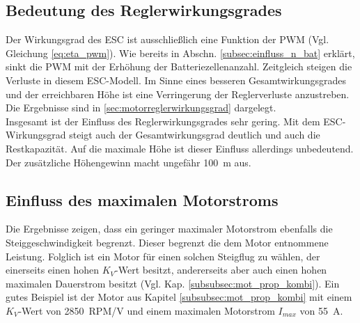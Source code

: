 \subsection{Bedeutung des Reglerwirkungsgrades}
\label{subsec:einfluss_eta_pwm}
Der Wirkungsgrad des ESC ist ausschließlich eine Funktion der PWM (Vgl. Gleichung \ref{eq:eta_pwm}). Wie bereits in Abschn. \ref{subsec:einfluss_n_bat} erklärt, sinkt die PWM mit der Erhöhung der Batteriezellenanzahl. Zeitgleich steigen die Verluste in diesem ESC-Modell. Im Sinne eines besseren Gesamtwirkungsgrades und der erreichbaren Höhe ist eine Verringerung der Reglerverluste anzustreben. Die Ergebnisse sind in \ref{sec:motorreglerwirkungsgrad} dargelegt. \\
Insgesamt ist der Einfluss des Reglerwirkungsgrades sehr gering. Mit dem ESC-Wirkungsgrad steigt auch der Gesamtwirkungsgrad deutlich und auch die Restkapazität. Auf die maximale Höhe ist dieser Einfluss allerdings unbedeutend. Der zusätzliche Höhengewinn macht ungefähr \SI{100}{m} aus.



\subsection{Einfluss des maximalen Motorstroms}
Die Ergebnisse zeigen, dass ein geringer maximaler Motorstrom ebenfalls die Steiggeschwindigkeit begrenzt. Dieser begrenzt die dem Motor entnommene Leistung. 
Folglich ist ein Motor für einen solchen Steigflug zu wählen, der einerseits einen hohen \ensuremath{K_V}-Wert besitzt, andererseits aber auch einen hohen maximalen Dauerstrom besitzt (Vgl. Kap. \ref{subsubsec:mot_prop_kombi}). Ein gutes Beispiel ist der Motor aus Kapitel \ref{subsubsec:mot_prop_kombi} mit einem \ensuremath{K_V}-Wert von \SI{2850}{RPM/V} und einem maximalen Motorstrom \ensuremath{I_{max}} von \SI{55}{A}.




